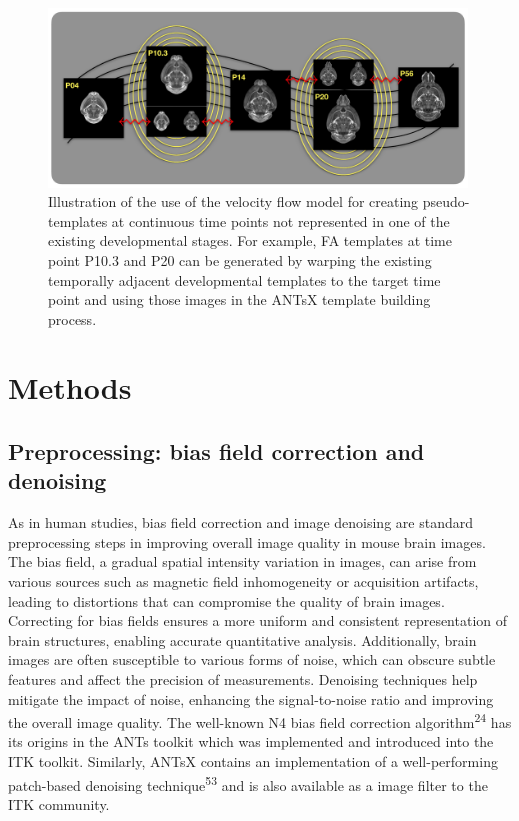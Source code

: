 \documentclass[
  12pt,
]{article}
\begin{document}
\begin{figure}[!htb]
\centering
\includegraphics[width=0.99\textwidth]{Figures/pseudo_template.pdf}
\caption{Illustration of the use of the velocity flow model for creating pseudo-templates
at continuous time points not represented in one of the existing developmental stages.
For example, FA templates at time point P10.3 and P20 can be generated by warping the 
existing temporally adjacent developmental templates to the target time point and using 
those images in the ANTsX template building process.}
\label{fig:pseudo}
\end{figure}

\clearpage
\newpage

\hypertarget{methods}{%
\section*{Methods}\label{methods}}

\hypertarget{preprocessing-bias-field-correction-and-denoising}{%
\subsection*{Preprocessing: bias field correction and
denoising}\label{preprocessing-bias-field-correction-and-denoising}}

As in human studies, bias field correction and image denoising are
standard preprocessing steps in improving overall image quality in mouse
brain images. The bias field, a gradual spatial intensity variation in
images, can arise from various sources such as magnetic field
inhomogeneity or acquisition artifacts, leading to distortions that can
compromise the quality of brain images. Correcting for bias fields
ensures a more uniform and consistent representation of brain
structures, enabling accurate quantitative analysis. Additionally, brain
images are often susceptible to various forms of noise, which can
obscure subtle features and affect the precision of measurements.
Denoising techniques help mitigate the impact of noise, enhancing the
signal-to-noise ratio and improving the overall image quality. The
well-known N4 bias field correction algorithm\textsuperscript{24} has
its origins in the ANTs toolkit which was implemented and introduced
into the ITK toolkit. Similarly, ANTsX contains an implementation of a
well-performing patch-based denoising technique\textsuperscript{53} and
is also available as a image filter to the ITK community.
\end{document}
